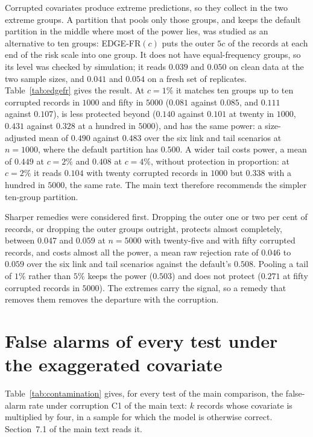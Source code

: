 \documentclass[11pt]{article}
\begin{document}
Corrupted covariates produce extreme predictions, so they collect in the two extreme groups. A partition
that pools only those groups, and keeps the default partition in the middle where most of the power
lies, was studied as an alternative to ten groups: \textsf{EDGE-FR}$(c)$ puts the outer $5c$ of the
records at each end of the risk scale into one group. It does not have equal-frequency groups, so its
level was checked by simulation; it reads $0.039$ and $0.050$ on clean data at the two sample sizes,
and $0.041$ and $0.054$ on a fresh set of replicates. Table~\ref{tab:edgefr} gives the result. At
$c=1\%$ it matches ten groups up to ten corrupted records in $1000$ and fifty in $5000$ ($0.081$ against
$0.085$, and $0.111$ against $0.107$), is less protected beyond ($0.140$ against $0.101$ at twenty in
$1000$, $0.431$ against $0.328$ at a hundred in $5000$), and has the same power: a size-adjusted mean of
$0.490$ against $0.483$ over the six link and tail scenarios at $n=1000$, where the default partition has $0.500$.
A wider tail costs power, a mean of $0.449$ at $c=2\%$ and $0.408$ at $c=4\%$, without protection in
proportion: at $c=2\%$ it
reads $0.104$ with twenty corrupted records in $1000$ but $0.338$ with a hundred in $5000$, the same
rate. The main text therefore recommends the simpler ten-group partition.



Sharper remedies were considered first. Dropping the outer one or two per
cent of records, or dropping the outer groups outright, protects almost completely, between $0.047$
and $0.059$ at $n=5000$ with twenty-five and with fifty corrupted records, and costs almost all the
power, a mean raw rejection rate of $0.046$ to $0.059$ over the six link and tail scenarios against
the default's $0.508$. Pooling a tail of $1\%$ rather than $5\%$ keeps the power ($0.503$) and does not protect
($0.271$ at fifty corrupted records in $5000$). The extremes carry the signal, so a remedy that
removes them removes the departure with the corruption.

\section{False alarms of every test under the exaggerated covariate}\label{si:contamination}

Table~\ref{tab:contamination} gives, for every test of the main comparison, the false-alarm rate under
corruption C1 of the main text: $k$ records whose covariate is multiplied by four, in a sample for which
the model is otherwise correct. Section~7.1 of the main text reads it.
\end{document}
